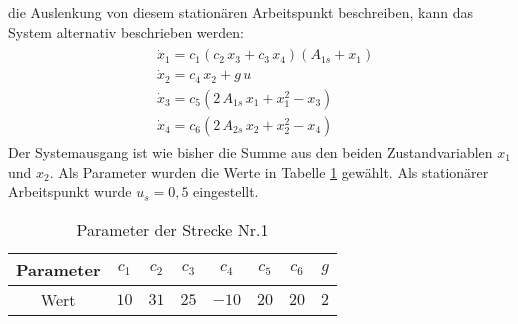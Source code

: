                die Auslenkung von diesem stationären Arbeitspunkt beschreiben, kann das System alternativ beschrieben werden:
                \begin{align}
                \begin{split}
                    &\dot{x}_1 = c_1(c_2\,x_3 + c_3\,x_4)(A_{1s}+x_1)\\
                    &\dot{x}_2 = c_4\,x_2+g\,u \\
                    &\dot{x}_3 = c_5(2\,A_{1s}\,x_1 + x_1^2 - x_3) \\
                    &\dot{x}_4 = c_6(2\,A_{2s}\,x_2 + x_2^2 - x_4)
                    \end{split} 
                \end{align}
                Der Systemausgang ist wie bisher die Summe aus den beiden Zustandvariablen $x_1$ und $x_2$. 
                Als Parameter wurden die Werte in Tabelle \ref{Tab:Parameter1} gewählt. Als stationärer Arbeitspunkt wurde $u_s = 0{,}5$ eingestellt.
                \begin{table}[h]
                    \begin{tabular}{|c||c|c|c|c|c|c|c|}
                        \hline
                        Parameter &$c_1$&$c_2$&$c_3$&$c_4$&$c_5$&$c_6$&$g$\\
                        \hline
                        Wert &$10$&$31$&$25$&$-10$&$20$&$20$&$2$\\
                        \hline
                    \end{tabular}
                    \centering
                    \caption{Parameter der Strecke Nr.1}
                    \label{Tab:Parameter1}
                \end{table}
         
